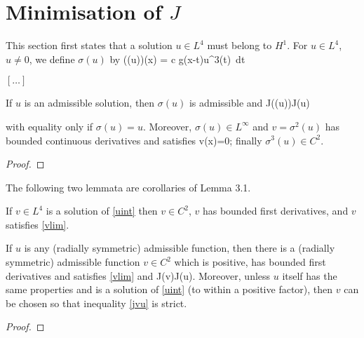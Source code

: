 \section{Minimisation of $J$}
This section first states that a solution $u\in L^4$ must belong to $H^1$.
For $u\in L^4$, $u\neq 0$, we define $\sigma(u)$ by 
\be \label{sigmadef} \left(\sigma(u)\right)(x) = c \int g(x-t)u^3(t)~dt \ee

$[\ldots]$

\begin{lemma} 
If $u$ is an admissible solution, then $\sigma(u)$ is admissible and
\be\label{jsigma}
J(\sigma(u))\leq J(u)
\ee

with equality only if $\sigma(u) = u$. Moreover, $\sigma(u)\in L^\infty$ 
and $v=\sigma^2(u)$ has bounded continuous derivatives and satisfies
\be\label{vlim}
 v(x)=0;
\ee
finally $\sigma^3(u)\in C^2$.
\end{lemma}
\begin{proof}
\end{proof}

The following two lemmata are corollaries of Lemma 3.1.
\begin{lemma} 
    If $v\in L^4$ is a solution of \eqref{uint} then $v\in C^2$, $v$ has
    bounded first derivatives, and $v$ satisfies \eqref{vlim}.
\end{lemma}
\begin{lemma} 
    If $u$ is any (radially symmetric) admissible function, then there is a
    (radially symmetric) admissible function $v\in C^2$ which is positive, has
    bounded first derivatives and satisfies \eqref{vlim} and 
\be\label{jvu}
J(v)\leq J(u).
\ee
    Moreover, unless $u$ itself has the same properties and is a solution of 
    \eqref{uint} (to within a positive factor), then $v$ can be chosen so that
    inequality \eqref{jvu} is strict.
\end{lemma}
\begin{proof}
\end{proof}

% 
% 

